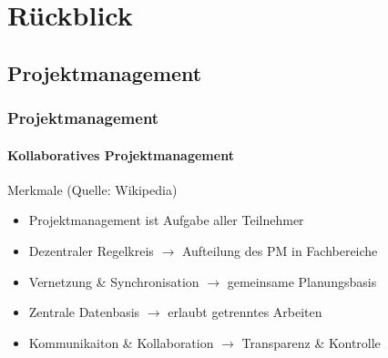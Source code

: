 \section{Rückblick}

\author{Ervin Mazlagi\'c}

\subsection{Projektmanagement}
\begin{frame}
	\frametitle{Projektmanagement\hfill{}\footnotesize \group}
	\framesubtitle{Kollaboratives Projektmanagement}
	\begin{block}{Merkmale (Quelle: Wikipedia)}
		\begin{itemize}
			\item Projektmanagement ist Aufgabe aller Teilnehmer
			\item Dezentraler Regelkreis $\rightarrow$ Aufteilung des PM in Fachbereiche
			\item Vernetzung \& Synchronisation $\rightarrow$ gemeinsame Planungsbasis
			\item Zentrale Datenbasis $\rightarrow$ erlaubt getrenntes Arbeiten
			\item Kommunikaiton \& Kollaboration $\rightarrow$ Transparenz \& Kontrolle
		\end{itemize}
	\end{block}
\end{frame}

